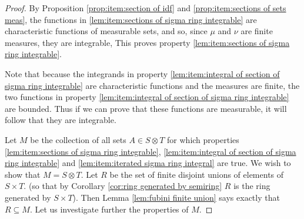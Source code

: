 \begin{proof}
By Proposition \ref{prop:item:section of idf} and \ref{prop:item:sections of sets meas}, the functions in \ref{lem:item:sections of sigma ring integrable} are characteristic functions of measurable sets, and so, since $\mu$ and $\nu$ are finite measures, they are integrable, This proves property \ref{lem:item:sections of sigma ring integrable}.

Note that because the integrands in property \ref{lem:item:integral of section of sigma ring integrable} are characteristic functions and the measures are finite, the two functions in property \ref{lem:item:integral of section of sigma ring integrable} are bounded. Thus if we can prove that these functions are measurable, it will follow that they are integrable.

Let $M$ be the collection of all sets $A\in S\otimes T$ for which properties \ref{lem:item:sections of sigma ring integrable}, \ref{lem:item:integral of section of sigma ring integrable} and \ref{lem:item:iterated sigma ring integral} are true. We wish to show that $M=S\otimes T$. Let $R$ be the set of finite disjoint unions of elements of $S\times T$. (so that by Corollary \ref{cor:ring generated by semiring} $R$ is the ring generated by $S\times T$). Then Lemma \ref{lem:fubini finite union} says exactly that $R\subseteq M$. Let us investigate further the properties of $M$.


\end{proof}
